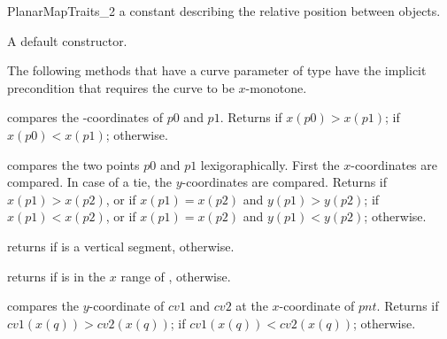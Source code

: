 \begin{ccRefConcept}{PlanarMapTraits_2}
{a constant describing the relative position between objects.}
   
\ccCreation
    

{A default constructor.}

\ccOperations
The following methods that have a curve parameter of type
 have the implicit precondition that requires the
curve to be $x$-monotone.



         {compares the -coordinates of $p0$ and $p1$.  Returns
           if $x(p0) > x(p1)$;  if
	  $x(p0) < x(p1)$;  otherwise.}
    
	 {compares the two points $p0$ and $p1$ lexigoraphically. First the
	   $x$-coordinates are compared. In case of a tie, the $y$-coordinates
	   are compared. Returns  if $x(p1) > x(p2)$, or if
	   $x(p1) = x(p2)$ and $y(p1) > y(p2)$;
	    if $x(p1) < x(p2)$, or if $x(p1) = x(p2)$ and
	   $y(p1) < y(p2)$;
	    otherwise.}

         {returns  if  is a vertical segment, 
           otherwise.}
        
         {returns  if  is in the $x$ range of
          ,  otherwise.}
    
         {compares the $y$-coordinate of $cv1$ and $cv2$ at the $x$-coordinate 
          of $pnt$. Returns  if $cv1(x(q)) > cv2(x(q))$;
           if $cv1(x(q)) < cv2(x(q))$; 
	  otherwise.
          }


\end{ccRefConcept}
